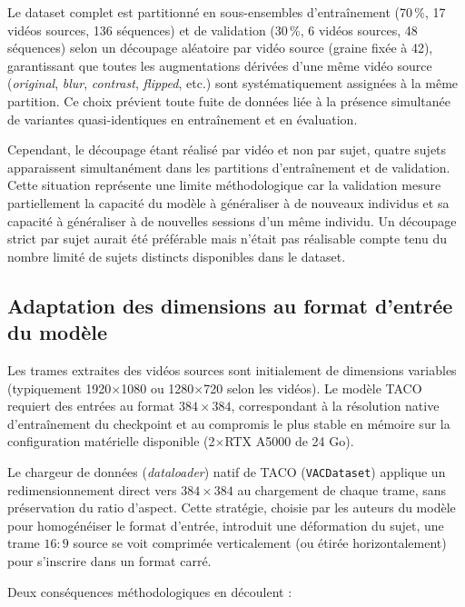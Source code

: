 Le dataset complet est partitionné en sous-ensembles d'entraînement (70\,\%, 17 vidéos sources, 136 séquences) et de validation (30\,\%, 6 vidéos sources, 48 séquences) selon un découpage aléatoire par vidéo source (graine fixée à 42), garantissant que toutes les augmentations dérivées d'une même vidéo source (\textit{original}, \textit{blur}, \textit{contrast}, \textit{flipped}, etc.) sont systématiquement assignées à la même partition. Ce choix prévient toute fuite de données liée à la présence simultanée de variantes quasi-identiques en entraînement et en évaluation.

Cependant, le découpage étant réalisé par vidéo et non par sujet, quatre sujets apparaissent simultanément dans les partitions d'entraînement et de validation. Cette situation représente une limite méthodologique car la validation mesure partiellement la capacité du modèle à généraliser à de nouveaux individus et sa capacité à généraliser à de nouvelles sessions d'un même individu. Un découpage strict par sujet aurait été préférable mais n'était pas réalisable compte tenu du nombre limité de sujets distincts disponibles dans le dataset.

\subsection{Adaptation des dimensions au format d'entrée du modèle}

Les trames extraites des vidéos sources sont initialement de dimensions variables (typiquement 1920$\times$1080 ou 1280$\times$720 selon les vidéos). Le modèle TACO requiert des entrées au format $384 \times 384$, correspondant à la résolution native d'entraînement du checkpoint et au compromis le plus stable en mémoire sur la configuration matérielle disponible (2$\times$RTX A5000 de 24 Go).

Le chargeur de données (\textit{dataloader}) natif de TACO (\texttt{VACDataset}) applique un redimensionnement direct vers $384 \times 384$ au chargement de chaque trame, sans préservation du ratio d'aspect. Cette stratégie, choisie par les auteurs du modèle pour homogénéiser le format d'entrée, introduit une déformation du sujet, une trame $16:9$ source se voit comprimée verticalement (ou étirée horizontalement) pour s'inscrire dans un format carré.

Deux conséquences méthodologiques en découlent :

